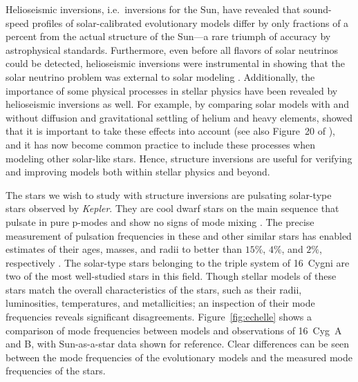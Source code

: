 Helioseismic inversions, i.e.~inversions for the Sun, have revealed that sound-speed profiles of solar-calibrated evolutionary models differ by only fractions of a percent from the actual structure of the Sun---a rare triumph of accuracy by astrophysical standards. 
Furthermore, even before all flavors of solar neutrinos could be detected, helioseismic inversions were instrumental in showing that the solar neutrino problem was external to solar modeling \citep[e.g.][]{1997MNRAS.289L...1A,1998PhLB..433....1B}.
Additionally, the importance of some physical processes in stellar physics have been revealed by helioseismic inversions as well. 
For example, by comparing solar models with and without diffusion and gravitational settling of helium and heavy elements, \citet{1993ApJ...403L..75C} showed that it is important to take these effects into account (see also Figure~20 of \citealt{2016lrsp...13....2b}), and it has now become common practice to include these processes when modeling other solar-like stars. 
Hence, structure inversions are useful for verifying and improving models both within stellar physics and beyond. 


The stars we wish to study with structure inversions are pulsating solar-type stars observed by \emph{Kepler}. 
They are cool dwarf stars on the main sequence that pulsate in pure p-modes and show no signs of mode mixing \citep[for a review of solar-like oscillations, see, e.g.,][]{2013ARA&A..51..353C}. 
The precise measurement of pulsation frequencies in these and other similar stars has enabled estimates of their ages, masses, and radii to better than $15\%$, $4\%$, and $2\%$, respectively \citep{2015MNRAS.452.2127S, 2017ApJ...835..173S, 2016apj...830...31b, 2017EPJWC.16005003B, 2017apj...839..116a}. 
The solar-type stars belonging to the triple system of 16~Cygni are two of the most well-studied stars in this field. 
Though stellar models of these stars match the overall characteristics of the stars, such as their radii, luminosities, temperatures, and metallicities; an inspection of their mode frequencies reveals significant disagreements. 
Figure~\ref{fig:echelle} shows a comparison of mode frequencies between models \citep[][models \emph{GOE}]{2017ApJ...835..173S} and observations \citep{2015MNRAS.446.2959D} of 16~Cyg~A and B, with Sun-as-a-star data shown for reference. 
Clear differences can be seen between the mode frequencies of the evolutionary models and the measured mode frequencies of the stars. 


